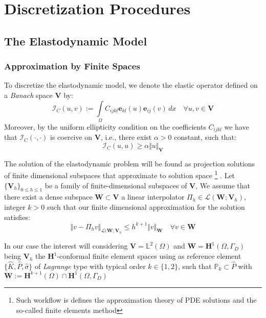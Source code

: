 \chapter{Discretization Procedures}



\section{The Elastodynamic Model}
\subsection{Approximation by Finite Spaces}
To discretize the elastodynamic model, we denote the elastic operator defined on a \textit{Banach} space $\mathbf{V}$ by:
\begin{equation*}
    \mathcal{I}_C (u,v) := \int \limits_{\Omega} C_{ijkl}\mathbf{e}_{kl}(u) \mathbf{e}_{ij}(v) \, dx \quad \forall u,v \in \mathbf{V}
\end{equation*}
Moreover, by the uniform ellipticity condition on the coefficients $C_{ijkl}$ we have that $\mathcal{I}_{C}(\cdot, \cdot)$ is coercive on $\mathbf{V}$, i.e., there exist $\alpha > 0$ constant, such that:
\begin{equation*}
    \mathcal{I}_C (u,u) \geq  \alpha \Vert u \Vert_{\mathbf{V}}
\end{equation*}

The solution of the elastodynamic problem will be found as projection solutions of finite dimensional subspaces that approximate to solution space \footnote{Such workflow is defines the approximation theory of PDE solutions and the so-called finite elements method} \cite{ern2004theory}.
Let $\{\mathbf{V}_h \}_{0 \leq h \leq 1}$ be a family of finite-dimensional subspaces of $\mathbf{V}$, We assume that there exist a dense subspace $\mathbf{W} \subset \mathbf{V}$ a linear interpolator $\Pi_h \in \mathcal{L}(\mathbf{W};\mathbf{V}_h)$, integer $k > 0$ such that our finite dimensional approximation for the solution satisfies:
\begin{equation*}
    \Vert v - \Pi_h v \Vert_{\mathcal{L}(\mathbf{W};\mathbf{V}_h} \leq h^{k+1} \Vert v \Vert_{\mathbf{W}} \quad \forall v \in \mathbf{W}
\end{equation*}
\begin{rem}
In our case the interest will considering $\mathbf{V} = \mathbb{L}^2(\Omega)$ and $\mathbf{W} = \mathbf{H}^1(\Omega, \Gamma_D)$ being $\mathbf{V}_h$ the $\mathbf{H}^1$-conformal finite element spaces using as reference element $\{ \hat{K}, \hat{P}, \hat{\sigma} \}$ of \textit{Lagrange} type with typical order $k \in \{1,2\}$, such that $\mathbb{P}_k \subset \hat{P}$ with $\mathbf{W} := \mathbf{H}^{k+1}(\Omega) \cap \mathbf{H}^1(\Omega, \Gamma_D)$
\end{rem}

